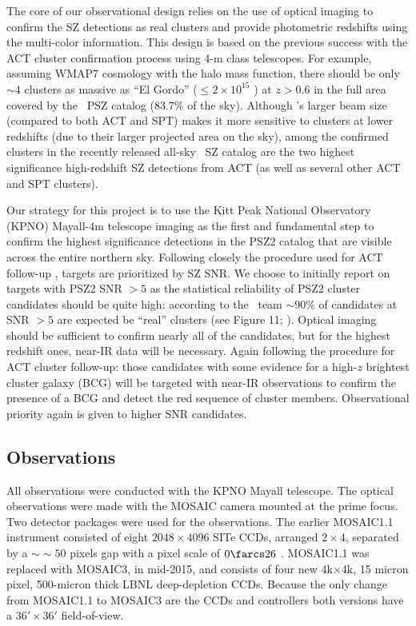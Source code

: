 \documentclass[apj, revtex4-1]{emulateapj}
\begin{document}
The core of our observational design relies on the use of optical imaging to confirm the SZ detections as real clusters and provide photometric redshifts using the multi-color information. This design is based on the previous success with the ACT cluster confirmation process using 4-m class telescopes.
%
For example, assuming WMAP7 cosmology \citep{Komatsu2011} with the \cite{Tinker2008} halo mass function, there should be only $\sim4$ clusters as massive as ``El Gordo'' ($\leq 2 \times 10^{15}$ \Msol) at $z > 0.6$ in the full area covered by the \planck\ PSZ catalog (83.7\% of the sky). Although \planck’s larger beam size (compared to both ACT and SPT) makes it more sensitive to clusters at lower redshifts (due to their larger projected area on the sky), among the confirmed clusters in the recently released all-sky \planck\ SZ catalog are the two highest significance high-redshift SZ detections from ACT (as well as several other ACT and SPT clusters).

Our strategy for this project is to use the Kitt Peak National Observatory (KPNO) Mayall-4m telescope imaging as the first and fundamental step to confirm the highest significance detections in the PSZ2 catalog that are visible across the entire northern sky.
%
%
Following closely the procedure used for ACT follow-up , targets are prioritized by SZ SNR. We choose to initially report on targets with PSZ2 SNR $>5$ as the statistical reliability of PSZ2 cluster candidates should be quite high: according to the \planck\ team $\sim90$\% of candidates at SNR $>5$ are expected be ``real'' clusters (see Figure 11; \citealt{PlanckCollaboration2015a}).
%
Optical imaging should be sufficient to confirm nearly all of the candidates, but for the highest redshift ones, near-IR data will be necessary. Again following the procedure for ACT cluster follow-up: those candidates with some evidence for a high-$z$ brightest cluster galaxy (BCG) will be targeted with near-IR observations to confirm the presence of a BCG and detect the red sequence of cluster members. Observational priority again is given to higher SNR candidates.

\subsection{Observations}\label{sec: observations}
All observations were conducted with the KPNO Mayall telescope. The optical observations were made with the MOSAIC camera mounted at the prime focus. Two detector packages were used for the observations. The earlier MOSAIC1.1 instrument consisted of eight $2048\times4096$ SITe CCDs, arranged $2\times4$, separated by a $∼\sim50$ pixels gap with a pixel scale of $0\farcs26$ \perpixel. MOSAIC1.1 was replaced with MOSAIC3, in mid-2015, and consists of four new 4k$\times$4k, 15 micron pixel, 500-micron thick LBNL deep-depletion CCDs. Because the only change from MOSAIC1.1 to MOSAIC3 are the CCDs and controllers both versions have a $36' \times 36'$ field-of-view.
\end{document}
